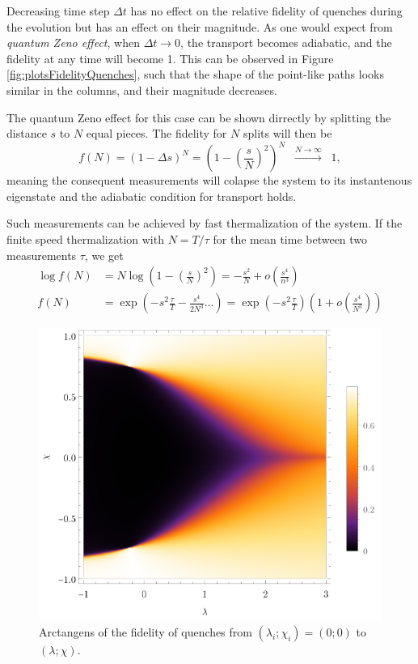 Decreasing time step $\Delta t$ has no effect on the relative fidelity of quenches during the evolution but has an effect on their magnitude. As one would expect from \emph{quantum Zeno effect}, when $\Delta t\rightarrow 0$, the transport becomes adiabatic, and the fidelity at any time will become 1. This can be observed in Figure \ref{fig:plotsFidelityQuenches}, such that the shape of the point-like paths looks similar in the columns, and their magnitude decreases.

The quantum Zeno effect for this case can be shown dirrectly by splitting the distance $s$ to $N$ equal pieces. The fidelity for $N$ splits will then be
\begin{equation}
    f(N)=(1-\Delta s)^N=\left(1-\left(\frac{s}{N}\right)^2\right)^N \;\;\overset{N\rightarrow\infty}{\longrightarrow}\;\; 1,
\end{equation}
meaning the consequent measurements will colapse the system to its instantenous eigenstate and the adiabatic condition for transport holds. 

Such measurements can be achieved by fast thermalization of the system. If the finite speed thermalization with $N=T/\tau$ for the mean time between two measurements $\tau$, we get
\begin{equation}
    \begin{split}
        \log f(N) &= N \log \left(1-\left(\frac{s}{N}\right)^2\right) = -\frac{s^2}{N}+o\left(\frac{s^4}{n^3}\right)\\
        f(N) &= \exp\left(-s^2\frac{\tau}{T}-\frac{s^4}{2 N^3}\dots\right) = \exp\left(-s^2\frac{\tau}{T}\right)\left(1+o\left(\frac{s^4}{N^3}\right)\right)
    \end{split}
\end{equation}


\begin{figure}[H]
    \centering
    \includegraphics[scale=1.2]{../img/quenchFidelityFrom00.pdf}
    \caption{Arctangens of the fidelity of quenches from $(\lambda_i;\chi_i)=(0;0)$ to $(\lambda;\chi)$.}
    \label{fig:quenchFidelityFrom00}    
\end{figure}

